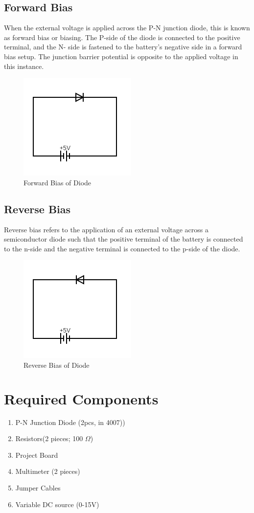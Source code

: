 \subsection{Forward Bias}
When the external voltage is applied across the P-N junction diode, this is known as forward
bias or biasing. The P-side of the diode is connected to the positive terminal, and the N-
side is fastened to the battery’s negative side in a forward bias setup. The junction barrier
potential is opposite to the applied voltage in this instance.
\begin{figure}[H]
    \centering
    \includegraphics[scale=0.6]{src/exp02/circuit (3).png}
    \caption{Forward Bias of Diode}
\end{figure}
\subsection{Reverse Bias}
Reverse bias refers to the application of an external voltage across a semiconductor diode
such that the positive terminal of the battery is connected to the n-side and the negative
terminal is connected to the p-side of the diode.
\begin{figure}[H]
    \centering
    \includegraphics[scale=0.6]{src/exp02/circuit (4).png}
    \caption{Reverse Bias of Diode}
\end{figure}

\section{Required Components}
\begin{enumerate}
    \item P-N Junction Diode (2pcs, in 4007))
    \item Resistors(2 pieces; 100 $\Omega$)
    \item Project Board
    \item Multimeter (2 pieces)
    \item Jumper Cables
    \item Variable DC source (0-15V)
\end{enumerate}

